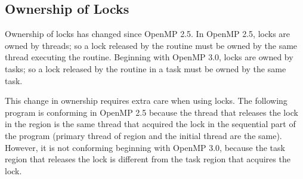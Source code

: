 \subsection{Ownership of Locks}
\label{subsec:lock_owner}

Ownership of locks has changed since OpenMP 2.5. In OpenMP 2.5, locks are owned 
by threads; so a lock released by the  routine must be 
owned by the same thread executing the routine.  Beginning with OpenMP 3.0, locks are owned 
by tasks; so a lock released by the  routine in
a task must be owned by the same task.

This change in ownership requires extra care when using locks. The following program 
is conforming in OpenMP 2.5 because the thread that releases the lock  
in the  region is the same thread that acquired the lock in the sequential
part of the program (primary thread of  region and the initial thread are
the same). However, it is not conforming beginning with OpenMP 3.0, because the task 
region that releases the lock  is different from the task region that 
acquires the lock.




